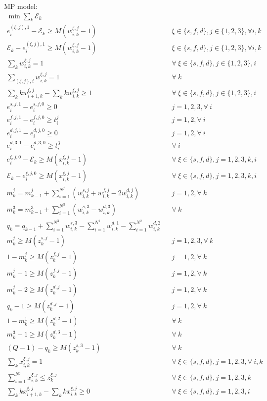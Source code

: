 \documentclass[]{interact}
\theoremstyle{plain}%
\theoremstyle{definition}
\theoremstyle{remark}
\begin{document}
MP model:
\begin{eqnarray}
\min{\sum_{k}\mathcal{E}_k}\\
e^{(\xi,j),1}_i - \mathcal{E}_{k}\ge M(w^{\xi,j}_{i,k}-1)&&\xi\in\{s,f,d\}, j\in\{1,2,3\},\forall i,k \\
\mathcal{E}_{k} - e^{(\xi,j),1}_i\ge M(w^{\xi,j}_{i,k}-1)&&\xi\in\{s,f,d\}, j\in\{1,2,3\},\forall i,k \\
\sum_{k} w^{\xi,j}_{i,k} =1&& \forall\ \xi\in\{s,f,d\}, j\in\{1,2,3\},i\\
\sum_{(\xi,j),i} w^{\xi,j}_{i,k} =1&& \forall\ k\\
\sum_{k} kw^{\xi,j}_{i+1,k} - \sum_{k} kw^{\xi,j}_{i,k} \ge 1&& \forall\  \xi\in\{s,f,d\}, j\in\{1,2,3\},i\\
e^{s,j,1}_{i} - e^{s,j,0}_{i} \ge 0 && j =1,2,3, \forall \ i\\
e^{f,j,1}_{i} - e^{f,j,0}_{i} \ge t^j_{i}&& j =1,2, \forall \ i\\
e^{d,j,1}_{i} - e^{d,j,0}_{i} \ge 0 && j =1,2, \forall \ i\\
e^{d,3,1}_{i} - e^{d,3,0}_{i} \ge t^3_{i}&&\forall \ i \\
e^{\xi,j,0}_i-\mathcal{E}_{k} \ge M(x^{\xi,j}_{i,k}-1)&& \forall\ \xi\in\{s,f,d\},j=1,2,3,k,i\\
\mathcal{E}_{k} -e^{\xi,j,0}_i\ge M(x^{\xi,j}_{i,k}-1)&& \forall\ \xi\in\{s,f,d\},j=1,2,3,k,i\\
m^j_k=m^j_{k-1} + \sum_{i=1}^{N^{j}} (w^{s,j}_{i,k}  + w^{f,j}_{i,k} - 2w^{d,j}_{i,k})&& j=1,2, \forall\ k\\
m^3_k=m^3_{k-1} + \sum_{i=1}^{N^{3}} (w^{s,3}_{i,k} - w^{d,3}_{i,k})&&\forall\ k\\
q_k = q_{k-1} + \sum_{i=1}^{N^{3}} w^{s,3}_{i,k} - \sum_{i=1}^{N^{1}} w^{d,1}_{i,k} - \sum_{i=1}^{N^{2}} w^{d,2}_{i,k}\\
m^j_k \ge M(z^{s,j}_{k}-1)&& j=1,2,3, \forall \ k\\
1- m^j_k \ge M(z^{f,j}_{k}-1)&& j=1,2, \forall \ k\\
m^j_k - 1 \ge M(z^{f,j}_{k}-1)&& j=1,2, \forall \ k\\
m^j_k - 2 \ge M(z^{d,j}_{k}-1)&& j=1,2, \forall \ k\\
q_k - 1 \ge M(z^{d,j}_{k}-1)&&  j=1,2, \forall \ k\\
1 - m^1_k \ge M(z^{d,2}_{k}-1)&& \forall\ k\\
m^3_k - 1 \ge M(z^{d,3}_{k}-1)&& \forall \ k\\
(Q-1) - q_k \ge M(z^{s,3}_{k}-1)&& \forall\ k\\
\sum_{k} x^{\xi,j}_{i,k} =1&& \forall\ \xi\in\{s,f,d\}, j=1,2,3, \forall\ i,k\\
\sum_{i=1}^{N^{j}}x^{\xi,j}_{i,k} \le z^{\xi,j}_{k}&& \forall\ \xi\in\{s,f,d\}, j=1,2,3, k\\
\sum_{k} kx^{\xi,j}_{i+1,k} - \sum_{k} kx^{\xi,j}_{i,k} \ge 0 && \forall\ \xi\in\{s,f,d\}, j=1,2,3, i
\end{eqnarray}
\end{document}
